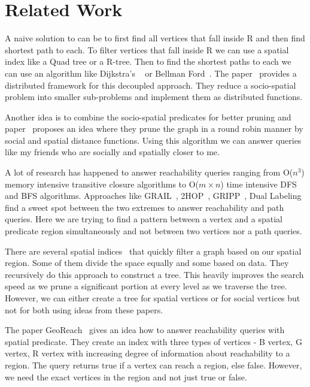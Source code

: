 \section{Related Work} \label{sec:relwork}
A naive solution to {\rrp} can be to first find all vertices that fall inside R and then find shortest path to each. To filter vertices that fall inside R we can use a spatial index like a Quad tree or a R-tree. Then to find the shortest paths to each we can use an algorithm like Dijkstra's ~\cite{S1990} or Bellman Ford~\cite{R1956}. The paper~\cite{NSD2013} provides a distributed framework for this decoupled approach. They reduce a socio-spatial problem into smaller sub-problems and implement them as distributed functions.

Another idea is to combine the socio-spatial predicates for better pruning and paper~\cite{KJY+2015} proposes an idea where they prune the graph in a round robin manner by social and spatial distance functions. Using this algorithm we can answer queries like my friends who are socially and spatially closer to me.

{A lot of research has happened to answer reachability queries ranging from O($n^3$}{) memory intensive transitive closure algorithms to O($m \times n$) time intensive DFS and BFS algorithms. Approaches like GRAIL~\cite{YCZ+2010}, 2HOP~\cite{CHK+2003}, GRIPP~\cite{SU2007}, Dual Labeling~\cite{HHJ+2006} find a sweet spot between the two extremes to answer reachability and path queries. Here we are trying to find a pattern between a vertex and a spatial predicate region simultaneously and not between two vertices nor a path queries. }

There are several spatial indices~\cite{PMA2001,H2006,SS2003} that quickly filter a graph based on our spatial region. Some of them divide the space equally and some based on data. They recursively do this approach to construct a tree. This heavily improves the search speed as we prune a significant portion at every level as we traverse the tree. However, we can either create a tree for spatial vertices or for social vertices but not for both using ideas from these papers.

The paper GeoReach~\cite{YM2016} gives an idea how to answer reachability queries with spatial predicate. They create an index with three types of vertices - B vertex, G vertex, R vertex with increasing degree of information about reachability to a region. The query returns true if a vertex can reach a region, else false. However, we need the exact vertices in the region and not just true or false.
